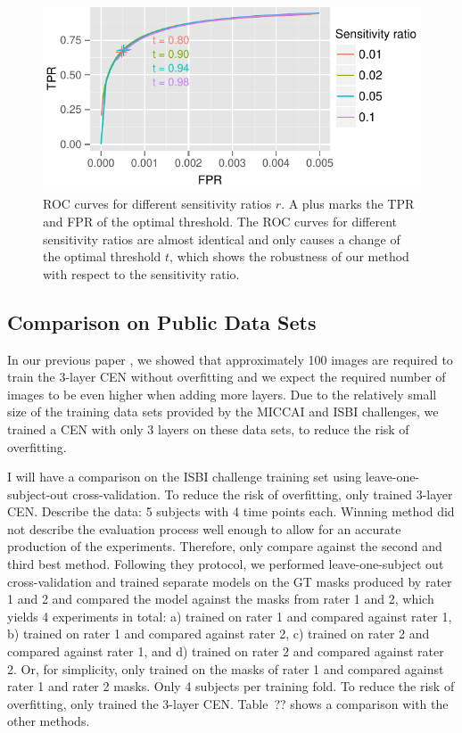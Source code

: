 \begin{figure}
\centering
\includegraphics[width=\columnwidth]{figures/roc}
\caption{ROC curves for different sensitivity ratios $r$. A plus marks the TPR
and FPR of the optimal threshold. The ROC curves for different sensitivity
ratios are almost identical and only causes a change of the optimal threshold
$t$, which shows the robustness of our method with respect to the sensitivity
ratio.}
\end{figure}

\subsection{Comparison on Public Data Sets}

In our previous paper \cite{brosch2015}, we showed that approximately 100 images
are required to train the 3-layer CEN without overfitting and we expect the
required number of images to be even higher when adding more layers. Due to the
relatively small size of the training data sets provided by the MICCAI and ISBI
challenges, we trained a CEN with only 3 layers on these data sets, to reduce
the risk of overfitting.

I will have a comparison on the ISBI challenge training set using
leave-one-subject-out cross-validation. To reduce the risk of overfitting, only
trained 3-layer CEN. Describe the data: 5 subjects with 4 time points each.
Winning method did not describe the evaluation process well enough to allow for
an accurate production of the experiments. Therefore, only compare against the
second and third best method. Following they protocol, we performed
leave-one-subject out cross-validation and trained separate models on the GT
masks produced by rater 1 and 2 and compared the model against the masks from
rater 1 and 2, which yields 4 experiments in total: a) trained on rater 1 and
compared against rater 1, b) trained on rater 1 and compared against rater 2, c)
trained on rater 2 and compared against rater 1, and d) trained on rater 2 and
compared against rater 2. Or, for simplicity, only trained on the masks of rater
1 and compared against rater 1 and rater 2 masks. Only 4 subjects per training
fold. To reduce the risk of overfitting, only trained the 3-layer CEN. Table~??
shows a comparison with the other methods.

